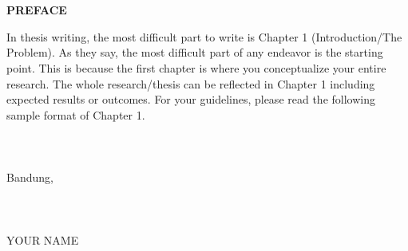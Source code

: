 \chapter*{}
\vspace*{-1.0cm}
\begin{center}
\normalfont\LARGE\textbf{PREFACE}
\end{center}
In thesis writing, the most difficult part to write is Chapter 1 (Introduction/The Problem). As they say, the most difficult part of any endeavor is the starting point. This is because the first chapter is where you conceptualize your entire research. The whole research/thesis can be reflected in Chapter 1 including expected results or outcomes. For your guidelines, please read the following sample format of Chapter 1.\\\\\\\\
Bandung,\\\\\\\\
YOUR NAME